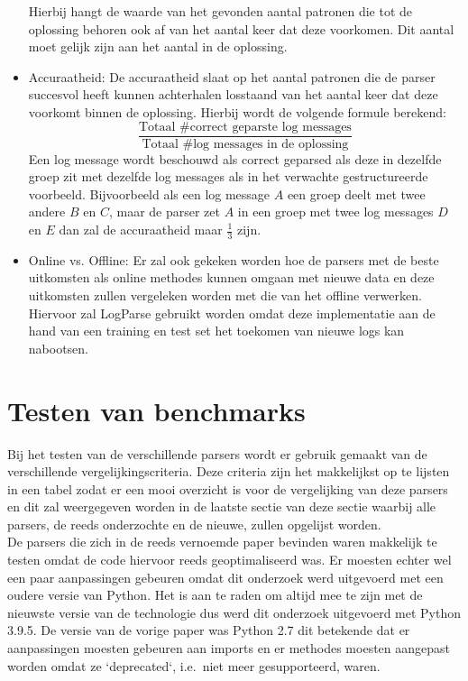 \begin{itemize}
    Hierbij hangt de waarde van het gevonden aantal patronen die tot de oplossing behoren ook af van het aantal keer dat deze voorkomen. Dit aantal moet gelijk zijn aan het aantal in de oplossing.\\
    
    \item Accuraatheid: De accuraatheid slaat op het aantal patronen die de parser succesvol heeft kunnen achterhalen losstaand van het aantal keer dat deze voorkomt binnen de oplossing. Hierbij wordt de volgende formule berekend: \[\frac{\text{Totaal \# correct geparste log messages}}{\text{Totaal \# log messages in de oplossing}}\] Een log message wordt beschouwd als correct geparsed als deze in dezelfde groep zit met dezelfde log messages als in het verwachte gestructureerde voorbeeld. Bijvoorbeeld als een log message $A$ een groep deelt met twee andere $B$ en $C$, maar de parser zet $A$ in een groep met twee log messages $D$ en $E$ dan zal de accuraatheid maar $\frac{1}{3}$ zijn.\\
    
   \item Online vs. Offline: Er zal ook gekeken worden hoe de parsers met de beste uitkomsten als online methodes kunnen omgaan met nieuwe data en deze uitkomsten zullen vergeleken worden met die van het offline verwerken. Hiervoor zal LogParse gebruikt worden omdat deze implementatie aan de hand van een training en test set het toekomen van nieuwe logs kan nabootsen.
\end{itemize}

\section{Testen van benchmarks}
Bij het testen van de verschillende parsers wordt er gebruik gemaakt van de verschillende vergelijkingscriteria. Deze criteria zijn het makkelijkst op te lijsten in een tabel zodat er een mooi overzicht is voor de vergelijking van deze parsers en dit zal weergegeven worden in de laatste sectie van deze sectie waarbij alle parsers, de reeds onderzochte en de nieuwe, zullen opgelijst worden.\\

De parsers die zich in de reeds vernoemde paper bevinden waren makkelijk te testen omdat de code hiervoor reeds geoptimaliseerd was. Er moesten echter wel een paar aanpassingen gebeuren omdat dit onderzoek werd uitgevoerd met een oudere versie van Python. Het is aan te raden om altijd mee te zijn met de nieuwste versie van de technologie dus werd dit onderzoek uitgevoerd met Python 3.9.5. De versie van de vorige paper was Python 2.7 dit betekende dat er aanpassingen moesten gebeuren aan imports en er methodes moesten aangepast worden omdat ze `deprecated`, i.e.\ niet meer gesupporteerd, waren.\\

